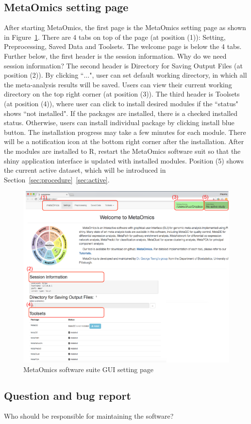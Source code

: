 \subsection{MetaOmics setting page}
\label{sec:setting}
After starting MetaOmics, 
the first page is the MetaOmics setting page as shown in Figure~\ref{fig:GUIsetting}.  
There are 4 tabs on top of the page (at position {\color{red} (1)}): Setting, Preprocessing, Saved Data and Toolsets.
The welcome page is below the 4 tabs.
Further below, the first header is the session information.
{
\color{blue}
Why do we need session information?
}
The second header is Directory for Saving Output Files (at position {\color{red} (2)}).
By clicking ``$\ldots$",
user can set default working directory, in which all the meta-analysis results will be saved.
Users can view their current working directory on the top right corner (at position {\color{red} (3)}).
The third header is Toolsets (at position {\color{red} (4)}),
where user can click to install desired modules if the ``status" shows ``not installed".
If the packages are installed, there is a checked installed status.
Otherwise, users can install individual package by clicking install blue button.
The installation progress may take a few minutes for each module.
There will be a notification icon at the bottom right corner after the installation. 
After the modules are installed to R, restart the MetaOmics software suit so that the shiny application interface is updated with installed modules.
Position {\color{red} (5)} shows the current active dataset, which will be introduced in Section~\ref{sec:procedure}~\ref{sec:active}. 
 
\begin{figure}[H]
\begin{center}
\includegraphics[scale=1]{./figure/preprocessing/GUIsetting}
\caption{MetaOmics software suite GUI setting page}
\label{fig:GUIsetting}
\end{center}
\end{figure}


\subsection{Question and bug report}
{
\color{red}
Who should be responsible for maintaining the software?
}

 
